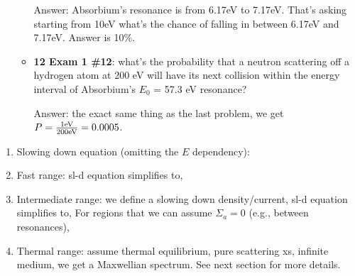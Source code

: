 \documentclass{school-22.211-notes}
\begin{document}
\begin{enumerate}
\begin{itemize}
      Answer: Absorbium's resonance is from 6.17eV to 7.17eV. That's asking starting from 10eV what's the chance of falling in between 6.17eV and 7.17eV. Answer is 10\%. 

    \item \textbf{12 Exam 1 \#12}: what's the probability that a neutron scattering off a hydrogen atom at 200 eV will have its next collision within the energy interval of Absorbium's $E_0$ = 57.3 eV resonance? 

      Answer: the exact same thing as the last problem, we get $P = \frac{1 \mathrm{eV}}{200 \mathrm{eV}} = 0.0005$. 
  \end{itemize}

\end{enumerate}


\clearpage
{} 
\begin{enumerate}
\item Slowing down equation (omitting the $E$ dependency): 
  
\item Fast range: sl-d equation simplifies to, 
  
\item Intermediate range: we define a slowing down density/current, 
  sl-d equation simplifies to, 
  For regions that we can assume $\Sigma_a = 0$ (e.g., between resonances), 

\item Thermal range: assume thermal equilibrium, pure scattering xs, infinite medium, we get a Maxwellian spectrum. See next section for more details.
\end{enumerate}
\end{document}
